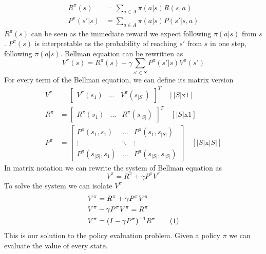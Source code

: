 \documentclass[main.tex]{subfiles}
\newcommand\numberthis{\addtocounter{equation}{1}\tag{\theequation}}
\begin{document}
\begin{align*}
    R^{\pi}(s)    & = \sum_{a\in A} \pi(a|s)R(s,a)    \\
    P^{\pi}(s'|s) & = \sum_{a\in A} \pi(a|s)P(s'|s,a)
\end{align*}
$R^{\pi}(s)$ can be seen as the immediate reward we expect following $\pi(a|s)$ from $s$. $P^{\pi}(s)$ is interpretable as the probability of reaching $s'$ from $s$ in one step, following $\pi(a|s)$.
Bellman equation can be rewritten as
\begin{equation*}
    V^{\pi}(s) = R^{\pi}(s) + \gamma \sum_{s' \in S} P^{\pi}(s'|s) V^{\pi}(s')
\end{equation*}
For every term of the Bellman equation, we can define its matrix version
\begin{align*}
    V^{\pi} & = \begin{bmatrix} V^{\pi}(s_1) & \dots & V^{\pi}(s_{|S|}) \end{bmatrix}^T \quad [|S|\text{x}1] \\
    R^{\pi} & = \begin{bmatrix} R^{\pi}(s_1) & \dots & R^{\pi}(s_{|S|}) \end{bmatrix}^T \quad [|S|\text{x}1] \\
    P^{\pi} & = \begin{bmatrix}
                    P^{\pi}(s_1,s_1)     & \dots  & P^{\pi}(s_1,s_{|S|})     \\
                    \vdots               & \ddots & \vdots                   \\
                    P^{\pi}(s_{|S|},s_1) & \dots  & P^{\pi}(s_{|S|},s_{|S|})
                \end{bmatrix} \quad [|S|\text{x}|S|]
\end{align*}
In matrix notation we can rewrite the system of Bellman equation as
\begin{equation}
    V^{\pi} = R^{\pi} + \gamma P^{\pi} V^{\pi}
\end{equation}
To solve the system we can isolate $V^{\pi}$
\begin{align*}
    V^{\pi} & = R^{\pi} + \gamma P^{\pi} V^{\pi}                               \\
    V^{\pi} & - \gamma P^{\pi} V^{\pi} = R^{\pi}                               \\
    V^{\pi} & = (I - \gamma P^{\pi})^{-1} R^{\pi} \label{eqn_V-pi} \numberthis
\end{align*}
This is our solution to the policy evaluation problem. Given a policy $\pi$ we can evaluate the value of every state.
\end{document}
